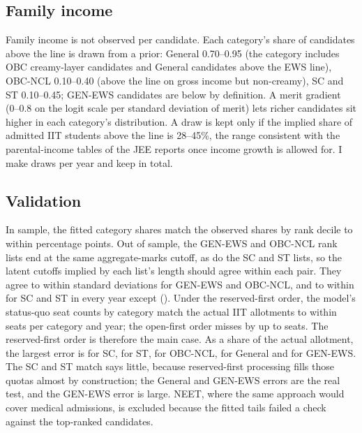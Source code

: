 \documentclass[11pt,a4paper]{article}
\begin{document}
\subsection{Family income}
Family income is not observed per candidate. Each category's share of candidates above the line is drawn from a prior: General 0.70--0.95 (the category includes OBC creamy-layer candidates and General candidates above the EWS line), OBC-NCL 0.10--0.40 (above the line on gross income but non-creamy), SC and ST 0.10--0.45; GEN-EWS candidates are below by definition. A merit gradient (0--0.8 on the logit scale per standard deviation of merit) lets richer candidates sit higher in each category's distribution. A draw is kept only if the implied share of admitted IIT students above the line is 28--45\%, the range consistent with the parental-income tables of the JEE reports once income growth is allowed for. I make \AllocDraws{} draws per year and keep \AllocDrawsKept{} in total.

\subsection{Validation}
\label{sec:allocation-validation}
In sample, the fitted category shares match the observed shares by rank decile to within \AllocMaxDecileError{} percentage points. Out of sample, the GEN-EWS and OBC-NCL rank lists end at the same aggregate-marks cutoff, as do the SC and ST lists, so the latent cutoffs implied by each list's length should agree within each pair. They agree to within \AllocGapEWSOBC{} standard deviations for GEN-EWS and OBC-NCL, and to within \AllocGapSCSTOthers{} for SC and ST in every year except \AllocGapSCSTWorstYear{} (\AllocGapSCSTWorst). Under the reserved-first order, the model's status-quo seat counts by category match the actual IIT allotments to within \AllocMaxAllotmentGap{} seats per category and year; the open-first order misses by up to \AllocMaxAllotmentGapOpenFirst{} seats. The reserved-first order is therefore the main case. As a share of the actual allotment, the largest error is \AllotErrSC{} for SC, \AllotErrST{} for ST, \AllotErrOBC{} for OBC-NCL, \AllotErrGEN{} for General and \AllotErrEWS{} for GEN-EWS. The SC and ST match says little, because reserved-first processing fills those quotas almost by construction; the General and GEN-EWS errors are the real test, and the GEN-EWS error is large. NEET, where the same approach would cover medical admissions, is excluded because the fitted tails failed a check against the top-ranked candidates.
\end{document}
